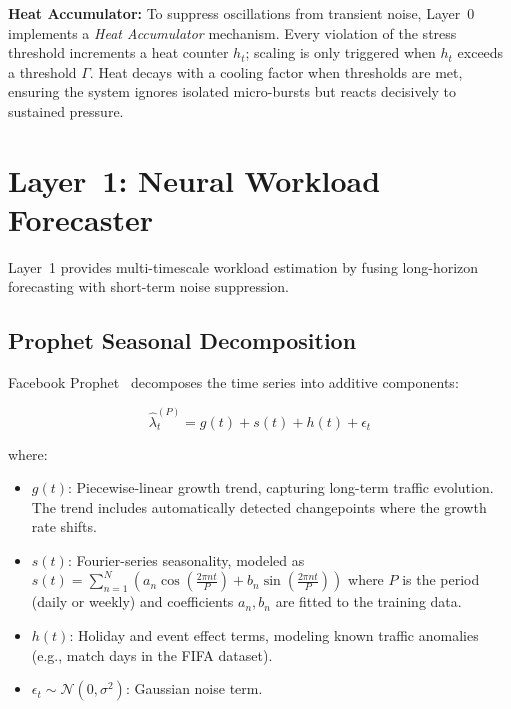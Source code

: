 \documentclass[conference]{IEEEtran}
\begin{document}
\textbf{Heat Accumulator:} To suppress oscillations from transient noise, Layer~0 implements a \emph{Heat Accumulator} mechanism. Every violation of the stress threshold increments a heat counter $h_t$; scaling is only triggered when $h_t$ exceeds a threshold $\Gamma$. Heat decays with a cooling factor when thresholds are met, ensuring the system ignores isolated micro-bursts but reacts decisively to sustained pressure.

\section{Layer~1: Neural Workload Forecaster}
\label{sec:layer1}

Layer~1 provides multi-timescale workload estimation by fusing long-horizon forecasting with short-term noise suppression.

\subsection{Prophet Seasonal Decomposition}

Facebook Prophet~\cite{guruge2025time} decomposes the time series into additive components:

\begin{equation}
\label{eq:prophet}
\hat{\lambda}^{(P)}_t = g(t) + s(t) + h(t) + \epsilon_t
\end{equation}

\noindent where:
\begin{itemize}
    \item $g(t)$: Piecewise-linear growth trend, capturing long-term traffic evolution. The trend includes automatically detected changepoints where the growth rate shifts.
    \item $s(t)$: Fourier-series seasonality, modeled as $s(t) = \sum_{n=1}^{N} \left(a_n \cos\!\left(\frac{2\pi nt}{P}\right) + b_n \sin\!\left(\frac{2\pi nt}{P}\right)\right)$ where $P$ is the period (daily or weekly) and coefficients $a_n, b_n$ are fitted to the training data.
    \item $h(t)$: Holiday and event effect terms, modeling known traffic anomalies (e.g., match days in the FIFA dataset).
    \item $\epsilon_t \sim \mathcal{N}(0, \sigma^2)$: Gaussian noise term.
\end{itemize}
\end{document}
